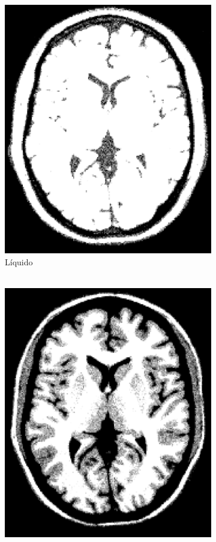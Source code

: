 \documentclass[letterpaper,12pt]{article}
\theoremstyle{plain}
\begin{document}
\begin{figure}[h]
\begin{subfigure}[h]{0.24\linewidth}
            \includegraphics[width=\textwidth]{Figuras/ImageA_25_62.png}
            \caption{Líquido \\ 
            $~$} 
         \end{subfigure}
         \begin{subfigure}[h]{0.24\linewidth}
            \centering
            \includegraphics[width=\textwidth]{Figuras/ImageA_62_113.png}

\end{subfigure}
\end{figure}
\end{document}
